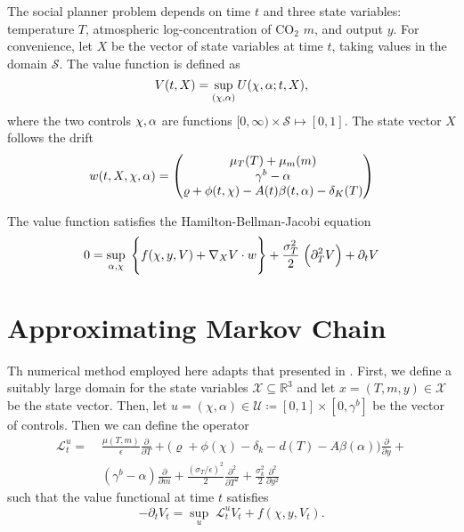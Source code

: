 \documentclass[../../main.tex]{subfiles}
\begin{document}
The social planner problem depends on time $t$ and three state variables: temperature $T$, atmospheric log-concentration of CO$_2$ $m$, and output $y$. For convenience, let $X$ be the vector of state variables at time $t$, taking values in the domain $\mathcal{S}$. The value function is defined as \begin{equation}
    V(t, X) = \sup_{(\chi, \alpha)} U(\chi, \alpha; t, X),
\end{equation} where the two controls $\chi, \alpha$ are functions $[0, \infty) \times \mathcal{S} \mapsto [0, 1]$. The state vector $X$ follows the drift \begin{equation}
    w(t, X,  \chi, \alpha) = \begin{pmatrix}
        \mu_T(T) + \mu_m(m) \\
        \gamma^{b} - \alpha \\
        \varrho + \phi(t, \chi) - A(t) \beta(t, \alpha) - \delta_K(T)
    \end{pmatrix}
\end{equation}

\begin{proposition}
    The value function satisfies the Hamilton-Bellman-Jacobi equation \begin{equation}
        0 = \sup_{\alpha, \chi} \; \Bigg\{ f(\chi, y, V ) + \nabla_X V \cdot w  \Bigg\} + \frac{\sigma_T^2}{2} \; \Big(\partial^2_T V \Big) + \partial_t V
    \end{equation}
\end{proposition}
\fi

\section{Approximating Markov Chain} \label{appendix:approximating-markov-chain}

Th numerical method employed here adapts that presented in \citep{kushner_numerical_2001}. First, we define a suitably large domain for the state variables $\mathcal{X} \subseteq \mathbb{R}^3$ and let $x = (T, m, y) \in \mathcal{X}$ be the state vector. Then, let $u = (\chi, \alpha) \in \mathcal{U} \coloneqq [0, 1] \times [0, \gamma^b]$ be the vector of controls. Then we can define the operator \begin{equation}
    \begin{split}
        \mathcal{L}_t^u = \; &\frac{\mu(T, m)}{\epsilon} \frac{\partial}{\partial T} + \big(\varrho + \phi(\chi) - \delta_k - d(T) - A \beta(\alpha) \big) \frac{\partial}{\partial y} + \\ 
        &(\gamma^b - \alpha)\frac{\partial}{\partial m} + \frac{(\sigma_T / \epsilon)^2}{2} \frac{\partial^2}{\partial T^2} + \frac{\sigma^2_k}{2} \frac{\partial^2}{\partial y^2} 
    \end{split}
\end{equation} such that the value functional at time $t$ satisfies \begin{equation} \label{eq:operator-definition}
    -\partial_t V_t =  \sup_{u} \; \mathcal{L}_t^u V_t + f(\chi, y, V_t).
\end{equation}
\end{document}

